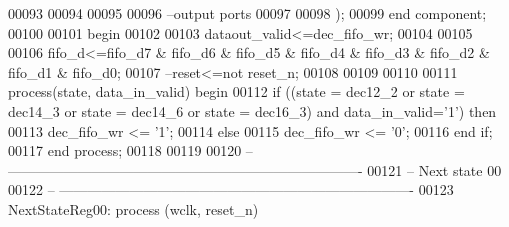 \begin{DoxyCode}
00093 
00094 
00095 
00096 \textcolor{keyword}{      --output ports }
00097         
00098         );
00099 \textcolor{keywordflow}{end} \textcolor{keywordflow}{component};
00100   
00101 \textcolor{vhdlkeyword}{begin}
00102   
00103 \textcolor{vhdlchar}{dataout_valid}\textcolor{vhdlchar}{<=}\textcolor{vhdlchar}{dec_fifo_wr};
00104 
00105 
00106 \textcolor{vhdlchar}{fifo_d}\textcolor{vhdlchar}{<=}\textcolor{vhdlchar}{fifo_d7} \textcolor{vhdlchar}{&} \textcolor{vhdlchar}{fifo_d6} \textcolor{vhdlchar}{&} \textcolor{vhdlchar}{fifo_d5} \textcolor{vhdlchar}{&} \textcolor{vhdlchar}{fifo_d4} \textcolor{vhdlchar}{&} \textcolor{vhdlchar}{fifo_d3} \textcolor{vhdlchar}{&} \textcolor{vhdlchar}{fifo_d2} \textcolor{vhdlchar}{&} \textcolor{vhdlchar}{fifo_d1} \textcolor{vhdlchar}{&} \textcolor{vhdlchar}{
      fifo_d0}; 
00107 \textcolor{keyword}{--reset<=not reset\_n;}
00108   
00109  
00110   
00111  \textcolor{keywordflow}{process}(state, data_in_valid) \textcolor{keywordflow}{begin}
00112     \textcolor{keywordflow}{if} \textcolor{vhdlchar}{(}\textcolor{vhdlchar}{(}\textcolor{vhdlchar}{state} \textcolor{vhdlchar}{=} \textcolor{vhdlchar}{dec12\_2} \textcolor{keywordflow}{or} \textcolor{vhdlchar}{state} \textcolor{vhdlchar}{=} \textcolor{vhdlchar}{dec14\_3} \textcolor{keywordflow}{or} \textcolor{vhdlchar}{state} \textcolor{vhdlchar}{=} \textcolor{vhdlchar}{dec14\_6} \textcolor{keywordflow}{or} \textcolor{vhdlchar}{state} \textcolor{vhdlchar}{=} \textcolor{vhdlchar}{dec16\_3}\textcolor{vhdlchar}{)} \textcolor{keywordflow}{and} \textcolor{vhdlchar}{
      data_in_valid}\textcolor{vhdlchar}{=}\textcolor{vhdlchar}{'}\textcolor{vhdllogic}{}\textcolor{vhdllogic}{1}\textcolor{vhdlchar}{'}\textcolor{vhdlchar}{)} \textcolor{keywordflow}{then}
00113             \textcolor{vhdlchar}{dec_fifo_wr} \textcolor{vhdlchar}{<=} \textcolor{vhdlchar}{'}\textcolor{vhdllogic}{}\textcolor{vhdllogic}{1}\textcolor{vhdlchar}{'}; 
00114     \textcolor{keywordflow}{else}
00115           \textcolor{vhdlchar}{dec_fifo_wr} \textcolor{vhdlchar}{<=} \textcolor{vhdlchar}{'}\textcolor{vhdllogic}{}\textcolor{vhdllogic}{0}\textcolor{vhdlchar}{'};
00116     \textcolor{keywordflow}{end} \textcolor{keywordflow}{if}; 
00117 \textcolor{keywordflow}{end} \textcolor{keywordflow}{process};
00118 
00119  
00120 \textcolor{keyword}{-- ----------------------------------------------------------------------------}
00121 \textcolor{keyword}{-- Next state 00}
00122 \textcolor{keyword}{-- ----------------------------------------------------------------------------}
00123     NextStateReg00: \textcolor{keywordflow}{process} (wclk, reset_n)

\end{DoxyCode}
